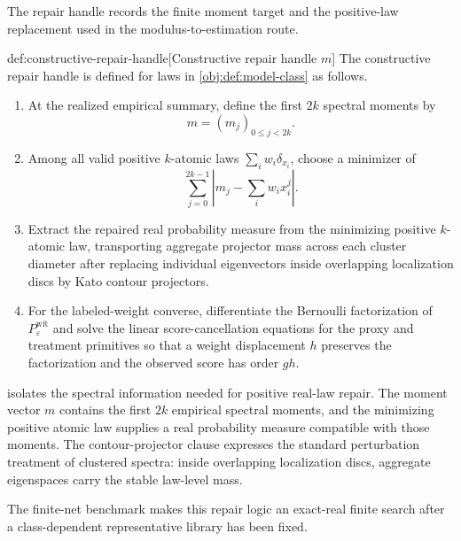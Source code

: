 \documentclass[11pt]{article}
\begin{document}
The repair handle records the finite moment target and the positive-law replacement used in the modulus-to-estimation route.

\begin{algorithmv}{def:constructive-repair-handle}[Constructive repair handle \(m\)]
The constructive repair handle is defined for laws in \cref{obj:def:model-class} as follows.
\begin{enumerate}
\item At the realized empirical summary, define the first \(2k\) spectral moments by
\[
m=(m_j)_{0\le j<2k}.
\]
\item Among all valid positive \(k\)-atomic laws \(\sum_i w_i\delta_{x_i}\), choose a minimizer of
\[
\sum_{j=0}^{2k-1}\left|m_j-\sum_i w_i x_i^j\right|.
\]
\item Extract the repaired real probability measure from the minimizing positive \(k\)-atomic law, transporting aggregate projector mass across each cluster diameter after replacing individual eigenvectors inside overlapping localization discs by Kato contour projectors.
\item For the labeled-weight converse, differentiate the Bernoulli factorization of \(P_{\varepsilon}^{\mathrm{wit}}\) and solve the linear score-cancellation equations for the proxy and treatment primitives so that a weight displacement \(h\) preserves the factorization and the observed score has order \(g h\).
\end{enumerate}
\end{algorithmv}

 isolates the spectral information needed for positive real-law repair. The moment vector \(m\) contains the first \(2k\) empirical spectral moments, and the minimizing positive atomic law supplies a real probability measure compatible with those moments. The contour-projector clause expresses the standard perturbation treatment of clustered spectra: inside overlapping localization discs, aggregate eigenspaces carry the stable law-level mass.

The finite-net benchmark makes this repair logic an exact-real finite search after a class-dependent representative library has been fixed.
\end{document}
